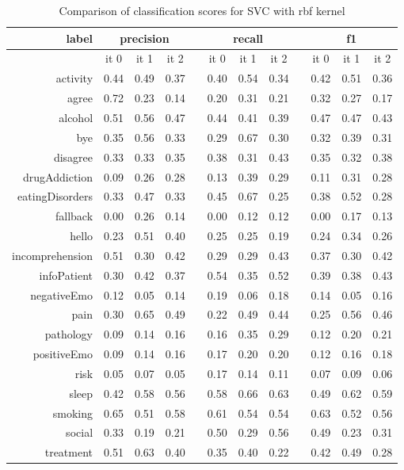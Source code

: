 \documentclass[11pt]{article}
\begin{document}
\begin{table}[htb]
\centering
\begin{tabular}{ |r|c|c|c|l|c|c|c|l|c|c|c| }
\hline
label 			& \multicolumn{3}{c|}{precision} && \multicolumn{3}{c|}{recall} && \multicolumn{3}{c|}{f1} \\ \hline 
				& it 0 &  it 1 & it 2 && it 0 & it 1 & it 2 && it 0 & it 1 & it 2\\ \hline 
activity 		& 0.44 &  0.49 & 0.37 && 0.40 & 0.54 & 0.34 && 0.42 & 0.51 & 0.36\\ \hline 
agree 			& 0.72 &  0.23 & 0.14 && 0.20 & 0.31 & 0.21 && 0.32 & 0.27 & 0.17\\ \hline 
alcohol 		& 0.51 &  0.56 & 0.47 && 0.44 & 0.41 & 0.39 && 0.47 & 0.47 & 0.43\\ \hline 
bye 			& 0.35 &  0.56 & 0.33 && 0.29 & 0.67 & 0.30 && 0.32 & 0.39 & 0.31\\ \hline 
disagree 		& 0.33 &  0.33 & 0.35 && 0.38 & 0.31 & 0.43 && 0.35 & 0.32 & 0.38\\ \hline 
drugAddiction 	& 0.09 &  0.26 & 0.28 && 0.13 & 0.39 & 0.29 && 0.11 & 0.31 & 0.28\\ \hline 
eatingDisorders & 0.33 &  0.47 & 0.33 && 0.45 & 0.67 & 0.25 && 0.38 & 0.52 & 0.28\\ \hline 
fallback 		& 0.00 &  0.26 & 0.14 && 0.00 & 0.12 & 0.12 && 0.00 & 0.17 & 0.13\\ \hline 
hello 			& 0.23 &  0.51 & 0.40 && 0.25 & 0.25 & 0.19 && 0.24 & 0.34 & 0.26\\ \hline 
incomprehension & 0.51 &  0.30 & 0.42 && 0.29 & 0.29 & 0.43 && 0.37 & 0.30 & 0.42\\ \hline 
infoPatient 	& 0.30 &  0.42 & 0.37 && 0.54 & 0.35 & 0.52 && 0.39 & 0.38 & 0.43\\ \hline 
negativeEmo 	& 0.12 &  0.05 & 0.14 && 0.19 & 0.06 & 0.18 && 0.14 & 0.05 & 0.16\\ \hline 
pain 			& 0.30 &  0.65 & 0.49 && 0.22 & 0.49 & 0.44 && 0.25 & 0.56 & 0.46\\ \hline 
pathology 		& 0.09 &  0.14 & 0.16 && 0.16 & 0.35 & 0.29 && 0.12 & 0.20 & 0.21\\ \hline 
positiveEmo 	& 0.09 &  0.14 & 0.16 && 0.17 & 0.20 & 0.20 && 0.12 & 0.16 & 0.18\\ \hline 
risk 			& 0.05 &  0.07 & 0.05 && 0.17 & 0.14 & 0.11 && 0.07 & 0.09 & 0.06\\ \hline 
sleep 			& 0.42 &  0.58 & 0.56 && 0.58 & 0.66 & 0.63 && 0.49 & 0.62 & 0.59\\ \hline 
smoking 		& 0.65 &  0.51 & 0.58 && 0.61 & 0.54 & 0.54 && 0.63 & 0.52 & 0.56\\ \hline 
social 			& 0.33 &  0.19 & 0.21 && 0.50 & 0.29 & 0.56 && 0.49 & 0.23 & 0.31\\ \hline 
treatment 		& 0.51 &  0.63 & 0.40 && 0.35 & 0.40 & 0.22 && 0.42 & 0.49 & 0.28\\ \hline 
\end{tabular}
\caption{Comparison of classification scores for SVC with rbf kernel}
\end{table}
\FloatBarrier
\end{document}

